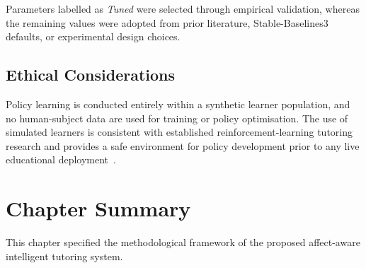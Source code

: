 \begin{table}[H]
\begin{tabular}{>{\raggedright\arraybackslash}p{5.2cm}
                >{\raggedright\arraybackslash}p{4.6cm}
                >{\raggedright\arraybackslash}p{4.6cm}}
\bottomrule
\end{tabular}
\end{table}


Parameters labelled as \emph{Tuned} were selected through empirical validation, whereas the remaining values were adopted from prior literature, Stable-Baselines3 defaults, or experimental design choices.

\subsection{Ethical Considerations}\label{sec:method_rl_ethics}

Policy learning is conducted entirely within a synthetic learner population, and no human-subject data are used for training or policy optimisation. The use of simulated learners is consistent with established reinforcement-learning tutoring research and provides a safe environment for policy development prior to any live educational deployment~\cite{doroudi_where_2019,mandel_offline_2014}.

 
\section{Chapter Summary}\label{sec:method_summary}

This chapter specified the methodological framework of the proposed affect-aware intelligent tutoring system.

